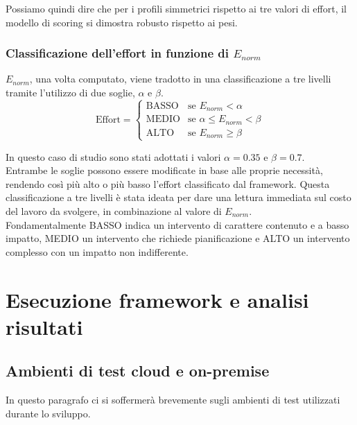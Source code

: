 \documentclass[a4paper,11pt]{report}
\begin{document}
Possiamo quindi dire che per i profili simmetrici rispetto ai tre valori di effort, il modello di scoring si dimostra robusto rispetto ai pesi.

\subsection{Classificazione dell'effort in funzione di $E_{norm}$}

$E_{norm}$, una volta computato, viene tradotto in una classificazione a tre livelli tramite l'utilizzo di due soglie, $\alpha$ e $\beta$.\\


\begin{equation}
\text{Effort} =
\begin{cases}
\text{BASSO} & \text{se } E_{norm} < \alpha \\
\text{MEDIO} & \text{se } \alpha \leq E_{norm} < \beta \\
\text{ALTO}  & \text{se } E_{norm} \geq \beta
\end{cases}
\end{equation}

In questo caso di studio sono stati adottati i valori $\alpha = 0.35$ e $\beta = 0.7$. \\
Entrambe le soglie possono essere modificate in base alle proprie necessità, rendendo così più alto o più basso l'effort classificato dal framework. Questa classificazione a tre livelli è stata ideata per dare una lettura immediata sul costo del lavoro da svolgere, in combinazione al valore di $E_{norm}$. \\
Fondamentalmente BASSO indica un intervento di carattere contenuto e a basso impatto, MEDIO un intervento che richiede pianificazione e ALTO un intervento complesso con un impatto non indifferente.

\chapter{Esecuzione framework e analisi risultati}

\section{Ambienti di test cloud e on-premise}

In questo paragrafo ci si soffermerà brevemente sugli ambienti di test utilizzati durante lo sviluppo.\\
\end{document}
